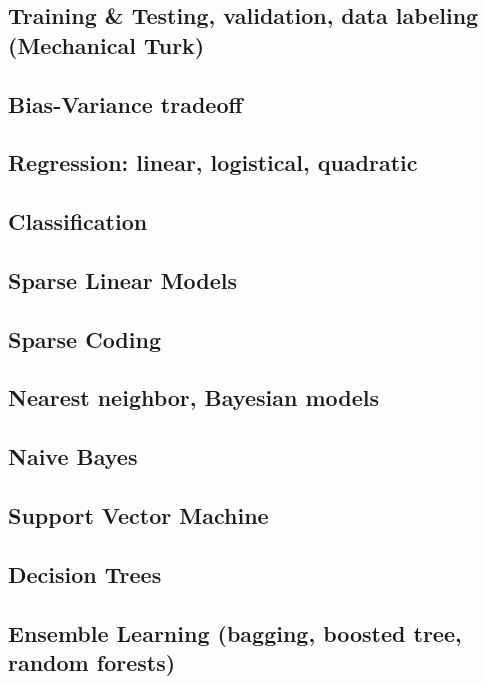 %
%

\subsection{Training \& Testing, validation, data labeling (Mechanical Turk)}

\subsection{Bias-Variance tradeoff}

\subsection{Regression: linear, logistical, quadratic}

\subsection{Classification}

\subsection{Sparse Linear Models}

\subsection{Sparse Coding}

\subsection{Nearest neighbor, Bayesian models}

\subsection{Naive Bayes}

\subsection{Support Vector Machine}

\subsection{Decision Trees}

\subsection{Ensemble Learning (bagging, boosted tree, random forests)}

